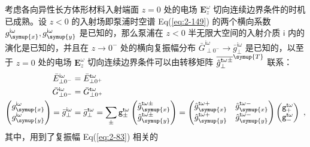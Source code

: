 考虑各向异性长方体形材料入射端面 $z=0$ 处的电场 $\symbf E^{\omega}_z$ 切向连续边界条件的时机已成熟。设 $z<0$ 的入射场即泵浦时空谱 Eq(\ref{eq:2-149}) 的两个横向系数 $g^{\mathsf{i}\omega}_{\symup{x}}, g^{\mathsf{i}\omega}_{\symup{y}}$ 是已知的，那么泵浦在 $z<0$ 半无限大空间的入射介质 $\mathsf{i}$ 内的演化是已知的，并且在 $z \to 0^-$ 处的横向复振幅分布 $\bar{G}^{\mathsf{i}\omega}_{\perp 0^-} \to \bar{g}^{\mathsf{i}\omega}_{\perp}$ 是已知的，以至于 $z=0$ 处的电场 $\symbf E^{\omega}_z$ 切向连续边界条件可以由转移矩阵 $\overline{\hat{g}^{\mathsf{t}\omega\pm}_{\perp}}^{\symup{T}}$ 联系：
\begin{subequations} \label{eq:2-150}
	\abovedisplayskip=6pt
	\belowdisplayskip=10pt
	\begin{align}
		\bar{E}^{\mathsf{i}\omega}_{\perp 0^-} &= \bar{E}^{\mathsf{t}\omega}_{\perp 0^+} \label{eq:2-150a}\\ \bar{G}^{\mathsf{i}\omega}_{\perp 0^-} &= \bar{G}^{\mathsf{t}\omega}_{\perp 0^+} \label{eq:2-150b}\\ \begin{pmatrix} g^{\mathsf{i}\omega}_{\symup{x}} \\ g^{\mathsf{i}\omega}_{\symup{y}} \end{pmatrix} = \bar{g}^{\mathsf{i}\omega}_{\perp} &= \bar{g}^{\mathsf{t}\omega}_{\perp} = \sum_{\pm} {\mathtt{g}}^{\mathsf{t}\omega}_{\pm} \begin{pmatrix} \hat{g}^{\mathsf{t}\omega\pm}_{\symup{x}} \\ \hat{g}^{\mathsf{t}\omega\pm}_{\symup{y}} \end{pmatrix} = \begin{pmatrix} \hat{g}^{\mathsf{t}\omega+}_{\symup{x}} & \hat{g}^{\mathsf{t}\omega-}_{\symup{x}} \\ \hat{g}^{\mathsf{t}\omega+}_{\symup{y}} & \hat{g}^{\mathsf{t}\omega-}_{\symup{y}} \end{pmatrix} \begin{pmatrix} {\mathtt{g}}^{\mathsf{t}\omega}_{+} \\ {\mathtt{g}}^{\mathsf{t}\omega}_{-} \end{pmatrix} \label{eq:2-150c}~,
	\end{align}
\end{subequations}
其中，用到了复振幅 Eq(\ref{eq:2-83}) 相关的
